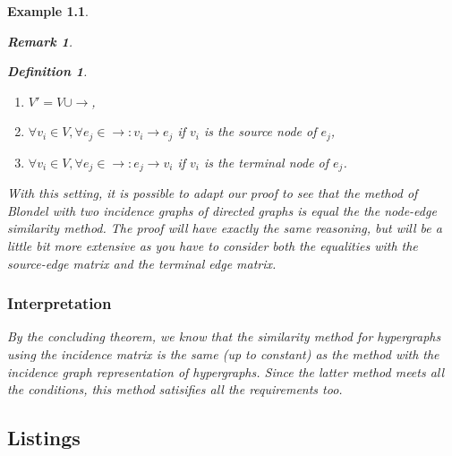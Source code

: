 \documentclass[a4paper,11pt]{report}
\newtheorem{example}[theorem]{Example}
\newtheorem{definition}[theorem]{Definition}
\newtheorem{remark}[theorem]{Remark}
\begin{document}
\begin{example}
\begin{remark}
\begin{definition}
  \begin{enumerate}
    \item $V' = V \cup \to$,
    \item $\forall v_i \in V, \forall e_j \in \to: v_i \to e_j$ if $v_i$ is the source node of $e_j$,
    \item $\forall v_i \in V, \forall e_j \in \to: e_j \to v_i$ if $v_i$ is the terminal node of $e_j$.
 \end{enumerate}

\end{definition}
With this setting, it is possible to adapt our proof to see that the method of Blondel with 
two incidence graphs of directed graphs is equal the the node-edge similarity 
method. The proof will have exactly the same reasoning, but will be a little bit 
more extensive as you have to consider both the equalities with the source-edge 
matrix and the terminal edge matrix.

 \end{remark}
\subsection{Interpretation}
By the concluding theorem, we know that the similarity method for hypergraphs 
using the incidence matrix is the same (up to constant) as the method with the 
incidence graph representation of hypergraphs. Since the latter method meets all 
the conditions, this method satisifies all the requirements too.
\begin{appendices}
  \chapter{Listings} \label{appendixa}%



\end{appendices}
\end{example}
\end{document}
